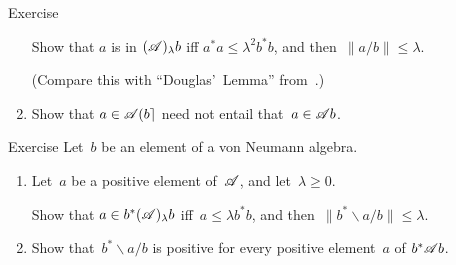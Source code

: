 \documentclass[a]{subfiles}
\begin{document}
\begin{parsec}
\begin{point}[douglas]{Exercise}
\begin{enumerate}
Show that $a$ is in $(\mathscr{A})_\lambda b$ iff $a^*a\leq \lambda^2 b^*b$,
and then~$\|a/b\|\leq \lambda$.

(Compare this with ``Douglas'~Lemma'' from~\cite{douglas}.)
\item
Show that $a \in \mathscr{A}\!\left(b\right\rceil$
need not entail that~$a\in \mathscr{A} b$.
\end{enumerate}
\end{point}
\begin{point}{Exercise}%
Let~$b$ be an element of a von Neumann algebra.
\begin{enumerate}
\item
Let~$a$ be a positive element of~$\mathscr{A}$,
and let~$\lambda\geq 0$.

Show that
 $a\in b^*(\mathscr{A})_\lambda b$
iff~$a\leq \lambda b^*b$,
and then~$\|b^*\backslash a / b \| \leq\lambda$.
\item
Show that~$b^*\backslash a / b$ is positive
for every positive element~$a$ of $ b^* \mathscr{A} b$.


\end{enumerate}
\end{point}
\end{parsec}
\end{document}
